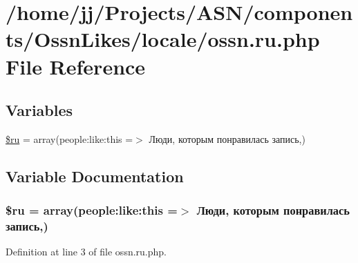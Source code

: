 \hypertarget{components_2_ossn_likes_2locale_2ossn_8ru_8php}{}\section{/home/jj/\+Projects/\+A\+S\+N/components/\+Ossn\+Likes/locale/ossn.ru.\+php File Reference}
\label{components_2_ossn_likes_2locale_2ossn_8ru_8php}
\subsection*{Variables}
\begin{DoxyCompactItemize}
\item 
\hyperlink{components_2_ossn_likes_2locale_2ossn_8ru_8php_aab84a3feda2b0e489cac7cd194e8d726}{\$ru} = array(\textquotesingle{}people\+:like\+:this\textquotesingle{} =$>$ \textquotesingle{}Люди, которым понравилась запись\textquotesingle{},)
\end{DoxyCompactItemize}


\subsection{Variable Documentation}
\subsubsection[{\texorpdfstring{\$ru}{$ru}}]{\setlength{\rightskip}{0pt plus 5cm}\$ru = array(\textquotesingle{}people\+:like\+:this\textquotesingle{} =$>$ \textquotesingle{}Люди, которым понравилась запись\textquotesingle{},)}\hypertarget{components_2_ossn_likes_2locale_2ossn_8ru_8php_aab84a3feda2b0e489cac7cd194e8d726}{}\label{components_2_ossn_likes_2locale_2ossn_8ru_8php_aab84a3feda2b0e489cac7cd194e8d726}


Definition at line 3 of file ossn.\+ru.\+php.

